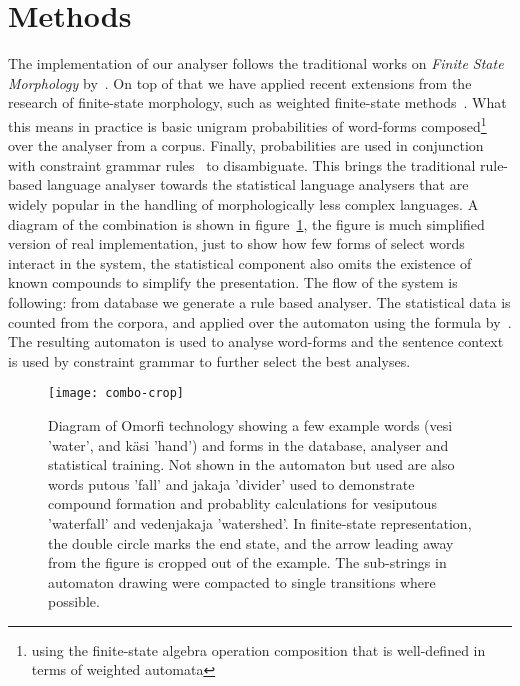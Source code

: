 \documentclass[a4paper,12pt]{article}
\begin{document}
\section{Methods}
\label{sec:methods}

The implementation of our analyser follows the traditional works on
\textit{Finite State Morphology} by~\citet{beesley2003finite}. On top of
that we have applied recent extensions from the research of finite-state
morphology, such as weighted finite-state methods~\citep{openfst,hfst2012}.
What this means in practice is basic unigram probabilities of word-forms
composed\footnote{using the finite-state algebra operation composition that
is well-defined in terms of weighted automata} over the analyser from a
corpus.  Finally, probabilities are used in conjunction with constraint
grammar rules~\cite{karlsson1995constraint} to disambiguate.  This brings
the traditional rule-based language analyser towards the statistical
language analysers that are widely popular in the handling of
morphologically less complex languages.  A diagram of the combination is
shown in figure~\ref{fig:combo}, the figure is much simplified version of
real implementation, just to show how few forms of select words interact in
the system, the statistical component also omits the existence of known
compounds to simplify the presentation. The flow of the system is following:
from database we generate a rule based analyser. The statistical data is
counted from the corpora, and applied over the automaton using the formula
by~\cite{pirinen2009weighted}. The resulting automaton is used to analyse
word-forms and the sentence context is used by constraint grammar to further
select the best analyses.

\begin{figure}[tb!]
    \texttt{[image: combo-crop]}
    \caption{Diagram of Omorfi technology showing a few example words (vesi
    'water', and käsi 'hand') and forms in the database, analyser and
statistical training. Not shown in the automaton but used are also words
putous 'fall' and jakaja 'divider' used to demonstrate compound formation
and probablity calculations for vesiputous 'waterfall' and vedenjakaja
'watershed'. In finite-state representation, the double circle marks the end
state, and the arrow leading away from the figure is cropped out of the
example. The sub-strings in automaton drawing were compacted to single
transitions where possible. \label{fig:combo}}
\end{figure}
\end{document}
